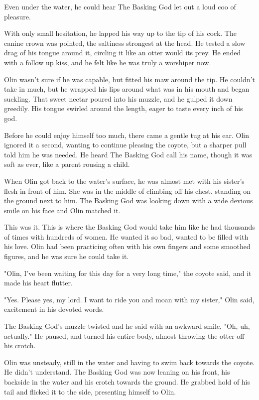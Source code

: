 Even under the water, he could hear The Basking God let out a loud coo of pleasure.

With only small hesitation, he lapped his way up to the tip of his cock. The canine crown was pointed, the saltiness strongest at the head. He tested a slow drag of his tongue around it, circling it like an otter would its prey. He ended with a follow up kiss, and he felt like he was truly a worshiper now.

Olin wasn't sure if he was capable, but fitted his maw around the tip. He couldn't take in much, but he wrapped his lips around what was in his mouth and began suckling. That sweet nectar poured into his muzzle, and he gulped it down greedily. His tongue swirled around the length, eager to taste every inch of his god.

Before he could enjoy himself too much, there came a gentle tug at his ear. Olin ignored it a second, wanting to continue pleasing the coyote, but a sharper pull told him he was needed. He heard The Basking God call his name, though it was soft as ever, like a parent rousing a child.

When Olin got back to the water's surface, he was almost met with his sister's flesh in front of him. She was in the middle of climbing off his chest, standing on the ground next to him. The Basking God was looking down with a wide devious smile on his face and Olin matched it.

This was it. This is where the Basking God would take him like he had thousands of times with hundreds of women. He wanted it so bad, wanted to be filled with his love. Olin had been practicing often with his own fingers and some smoothed figures, and he was sure he could take it.

"Olin, I've been waiting for this day for a very long time," the coyote said, and it made his heart flutter.

"Yes. Please yes, my lord. I want to ride you and moan with my sister," Olin said, excitement in his devoted words.

The Basking God's muzzle twisted and he said with an awkward smile, "Oh, uh, actually." He paused, and turned his entire body, almost throwing the otter off his crotch.

Olin was unsteady, still in the water and having to swim back towards the coyote. He didn't understand. The Basking God was now leaning on his front, his backside in the water and his crotch towards the ground. He grabbed hold of his tail and flicked it to the side, presenting himself to Olin.

